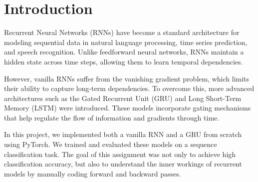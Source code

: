 \section{Introduction}
\label{sec:intro}

Recurrent Neural Networks (RNNs) have become a standard architecture for modeling sequential data in natural language processing, time series prediction, and speech recognition. Unlike feedforward neural networks, RNNs maintain a hidden state across time steps, allowing them to learn temporal dependencies.

However, vanilla RNNs suffer from the vanishing gradient problem, which limits their ability to capture long-term dependencies. To overcome this, more advanced architectures such as the Gated Recurrent Unit (GRU) and Long Short-Term Memory (LSTM) were introduced. These models incorporate gating mechanisms that help regulate the flow of information and gradients through time.

In this project, we implemented both a vanilla RNN and a GRU from scratch using PyTorch. We trained and evaluated these models on a sequence classification task. The goal of this assignment was not only to achieve high classification accuracy, but also to understand the inner workings of recurrent models by manually coding forward and backward passes.



